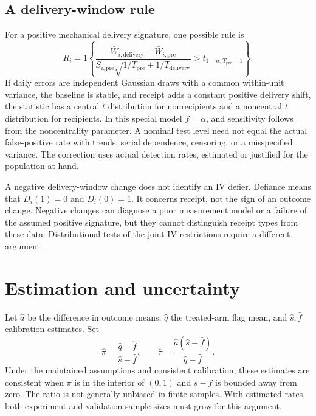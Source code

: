 \documentclass[11pt]{article}
\begin{document}
\subsection{A delivery-window rule}

For a positive mechanical delivery signature, one possible rule is
\begin{equation}\label{eq:rule}
R_i=1\left\{
\frac{\bar W_{i,\mathrm{delivery}}-\bar W_{i,\mathrm{pre}}}
 {S_{i,\mathrm{pre}}\sqrt{1/T_{\mathrm{pre}}+1/T_{\mathrm{delivery}}}}
 >t_{1-\alpha,T_{\mathrm{pre}}-1}\right\}.
\end{equation}
If daily errors are independent Gaussian draws with a common within-unit variance, the baseline is stable, and receipt adds a constant positive delivery shift, the statistic has a central $t$ distribution for nonrecipients and a noncentral $t$ distribution for recipients. In this special model $f=\alpha$, and sensitivity follows from the noncentrality parameter. A nominal test level need not equal the actual false-positive rate with trends, serial dependence, censoring, or a misspecified variance. The correction uses actual detection rates, estimated or justified for the population at hand.

A negative delivery-window change does not identify an IV defier. Defiance means that $D_i(1)=0$ and $D_i(0)=1$. It concerns receipt, not the sign of an outcome change. Negative changes can diagnose a poor measurement model or a failure of the assumed positive signature, but they cannot distinguish receipt types from these data. Distributional tests of the joint IV restrictions require a different argument \citep{kitagawa2015}.

\section{Estimation and uncertainty}

Let $\hat a$ be the difference in outcome means, $\hat q$ the treated-arm flag mean, and $\hat s,\hat f$ calibration estimates. Set
\begin{equation}
\hat\pi=\frac{\hat q-\hat f}{\hat s-\hat f},\qquad
\hat\tau=\frac{\hat a(\hat s-\hat f)}{\hat q-\hat f}.
\end{equation}
Under the maintained assumptions and consistent calibration, these estimates are consistent when $\pi$ is in the interior of $(0,1)$ and $s-f$ is bounded away from zero. The ratio is not generally unbiased in finite samples. With estimated rates, both experiment and validation sample sizes must grow for this argument.
\end{document}
